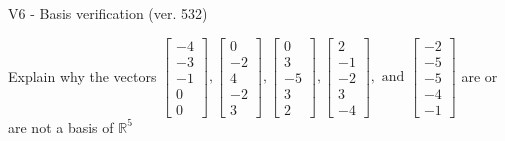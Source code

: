 \begin{exercise}
  \begin{exerciseTitle}V6 - Basis verification (ver. 532)\end{exerciseTitle}
  \begin{exerciseStatement}
    Explain why the vectors \(\left[\begin{array}{r}
-4 \\
-3 \\
-1 \\
0 \\
0
\end{array}\right] , \left[\begin{array}{r}
0 \\
-2 \\
4 \\
-2 \\
3
\end{array}\right] , \left[\begin{array}{r}
0 \\
3 \\
-5 \\
3 \\
2
\end{array}\right] , \left[\begin{array}{r}
2 \\
-1 \\
-2 \\
3 \\
-4
\end{array}\right] , \text{ and } \left[\begin{array}{r}
-2 \\
-5 \\
-5 \\
-4 \\
-1
\end{array}\right]\) are or are not a basis of \(\mathbb{R}^5\)	



\end{exerciseStatement}
\end{exercise}
